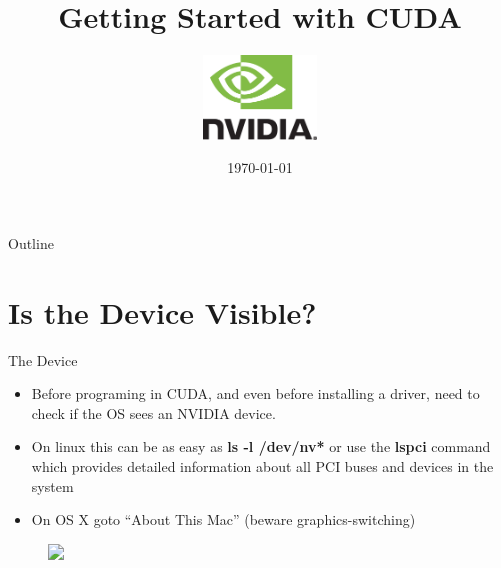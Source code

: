 \documentclass[handout]{beamer}
\title{Getting Started with CUDA}
\author{
	\includegraphics[width=3cm]{../media/logo/NVLogo_2D.eps}
	\vspace{0.75cm}
	\\}
\date{\today}
\begin{document}
\frame{\titlepage}

\begin{frame}{Outline}
\tableofcontents
\end{frame}



\section{Is the Device Visible?}
\begin{frame}{The Device}
\begin{itemize}
	\item<1->Before programing in CUDA, and even before installing a driver, need to check if the OS sees an NVIDIA device. 
	\item<2->On linux this can be as easy as \textbf{{\selectfont ls -l /dev/nv*}} or use the \textbf{{\selectfont lspci}} command which provides detailed information about all PCI buses and devices in the system
	\item<3->On OS X goto ``About This Mac'' (beware graphics-switching)
\end{itemize}

\begin{figure}
\begin{center}
\includegraphics<3->[width=6cm]{../media/AboutThisMac.png}
\end{center}
\end{figure}
\end{frame}
\end{document}
